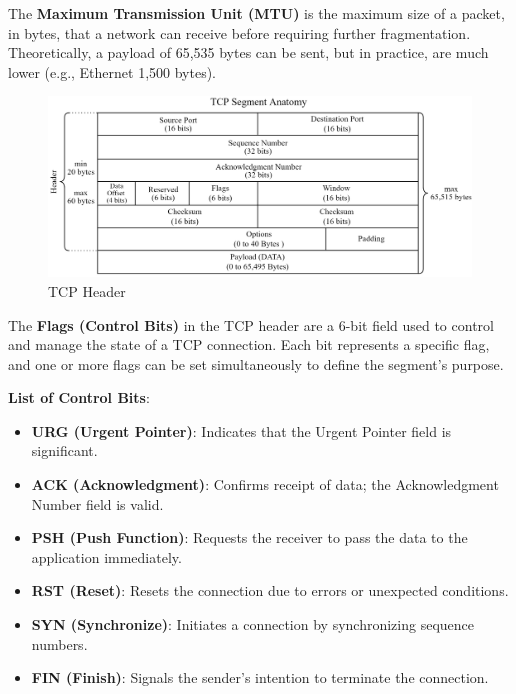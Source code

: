 \begin{Def}

    The \textbf{Maximum Transmission Unit (MTU)} is the maximum size of a packet, in bytes,
    that a network can receive before requiring further fragmentation. Theoretically, a payload 
    of 65,535 bytes can be sent, but in practice, are much lower (e.g., Ethernet 1,500 bytes). \cite{rfc894}\cite{rfc1191}
    
\end{Def}
    
\newpage

\vfill
\begin{figure}[h!]
    \hspace{-2.5em}
    \includegraphics[width=1.1\textwidth]{Sections/network/segment.png}
    \caption{TCP Header}
    \label{fig:tcp_header}
\end{figure}

\vfill
\begin{Def}

    The \textbf{Flags (Control Bits)} in the TCP header are a 6-bit field used to control and manage the state of a TCP connection. Each bit represents a specific flag, and one or more flags can be set simultaneously to define the segment's purpose.
    
    \textbf{List of Control Bits}:
    \begin{itemize}
        \item \textbf{URG (Urgent Pointer)}: Indicates that the Urgent Pointer field is significant.
        \item \textbf{ACK (Acknowledgment)}: Confirms receipt of data; the Acknowledgment Number field is valid.
        \item \textbf{PSH (Push Function)}: Requests the receiver to pass the data to the application immediately.
        \item \textbf{RST (Reset)}: Resets the connection due to errors or unexpected conditions.
        \item \textbf{SYN (Synchronize)}: Initiates a connection by synchronizing sequence numbers.
        \item \textbf{FIN (Finish)}: Signals the sender's intention to terminate the connection.
    \end{itemize}
    
    \hfill \cite{rfc793}
\end{Def}

